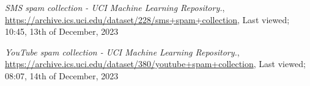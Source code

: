 \documentclass[lettersize,journal]{IEEEtran}
\begin{document}
\begin{thebibliography}{1}
{\it{SMS spam collection - UCI Machine Learning Repository.}}, \href{https://archive.ics.uci.edu/dataset/228/sms+spam+collection}{https://archive.ics.uci.edu/dataset/228/sms+spam+collection}, Last viewed; 10:45, 13th of December, 2023

{\it{YouTube spam collection - UCI Machine Learning Repository.}}, \href{https://archive.ics.uci.edu/dataset/380/youtube+spam+collection}{https://archive.ics.uci.edu/dataset/380/youtube+spam+collection}, Last viewed; 08:07, 14th of December, 2023



\end{thebibliography}
\end{document}
